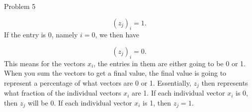 \begin{problem}{Problem 5}
\begin{highlight}
        \begin{equation}
            (z_{j})_{i} = 1.
        \end{equation}
        If the entry is 0, namely $i = 0$, we then have

        \begin{equation}
            (z_{j})_{i} = 0.
        \end{equation}
        This means for the vectors $x_{i}$, the entries in them are either going to be 0 or 1. When you sum the vectors to get a final value, the final value is going to represent a percentage of what vectors
        are 0 or 1. Essentially, $z_{j}$ then represents what fraction of the individual vectors $x_{i}$ are 1. If each individual vector $x_{i}$ is 0, then $z_{j}$ will be 0. If each individual vector $x_{i}$
        is 1, then $z_{j} = 1$.
    \end{highlight}
\end{problem}


